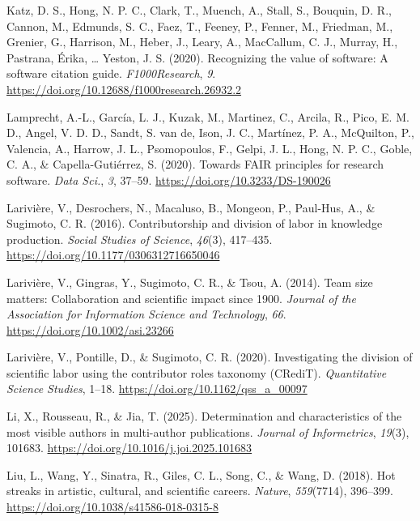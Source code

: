 \documentclass[
  number,
  3p,
  onecolumn]{elsarticle}
\newlength{\cslhangindent}
\newenvironment{CSLReferences}[2] %
 {\begin{list}{}{%
  \setlength{\itemindent}{0pt}
  \setlength{\leftmargin}{0pt}
  \setlength{\parsep}{0pt}
  \ifodd #1
   \setlength{\leftmargin}{\cslhangindent}
   \setlength{\itemindent}{-1\cslhangindent}
  \fi
  \setlength{\itemsep}{#2\baselineskip}}}
 {\end{list}}
\begin{document}
\begin{CSLReferences}{1}{0}
Katz, D. S., Hong, N. P. C., Clark, T., Muench, A., Stall, S., Bouquin,
D. R., Cannon, M., Edmunds, S. C., Faez, T., Feeney, P., Fenner, M.,
Friedman, M., Grenier, G., Harrison, M., Heber, J., Leary, A.,
MacCallum, C. J., Murray, H., Pastrana, Érika, \ldots{} Yeston, J. S.
(2020). Recognizing the value of software: A software citation guide.
\emph{F1000Research}, \emph{9}.
\url{https://doi.org/10.12688/f1000research.26932.2}

Lamprecht, A.-L., García, L. J., Kuzak, M., Martinez, C., Arcila, R.,
Pico, E. M. D., Angel, V. D. D., Sandt, S. van de, Ison, J. C.,
Martínez, P. A., McQuilton, P., Valencia, A., Harrow, J. L.,
Psomopoulos, F., Gelpi, J. L., Hong, N. P. C., Goble, C. A., \&
Capella-Gutiérrez, S. (2020). Towards FAIR principles for research
software. \emph{Data Sci.}, \emph{3}, 37--59.
\url{https://doi.org/10.3233/DS-190026}

Larivière, V., Desrochers, N., Macaluso, B., Mongeon, P., Paul-Hus, A.,
\& Sugimoto, C. R. (2016). Contributorship and division of labor in
knowledge production. \emph{Social Studies of Science}, \emph{46}(3),
417--435. \url{https://doi.org/10.1177/0306312716650046}

Larivière, V., Gingras, Y., Sugimoto, C. R., \& Tsou, A. (2014). Team
size matters: Collaboration and scientific impact since 1900.
\emph{Journal of the Association for Information Science and
Technology}, \emph{66}. \url{https://doi.org/10.1002/asi.23266}

Larivière, V., Pontille, D., \& Sugimoto, C. R. (2020). Investigating
the division of scientific labor using the contributor roles taxonomy
(CRediT). \emph{Quantitative Science Studies}, 1--18.
\url{https://doi.org/10.1162/qss_a_00097}

Li, X., Rousseau, R., \& Jia, T. (2025). Determination and
characteristics of the most visible authors in multi-author
publications. \emph{Journal of Informetrics}, \emph{19}(3), 101683.
\url{https://doi.org/10.1016/j.joi.2025.101683}

Liu, L., Wang, Y., Sinatra, R., Giles, C. L., Song, C., \& Wang, D.
(2018). Hot streaks in artistic, cultural, and scientific careers.
\emph{Nature}, \emph{559}(7714), 396--399.
\url{https://doi.org/10.1038/s41586-018-0315-8}


\end{CSLReferences}
\end{document}
